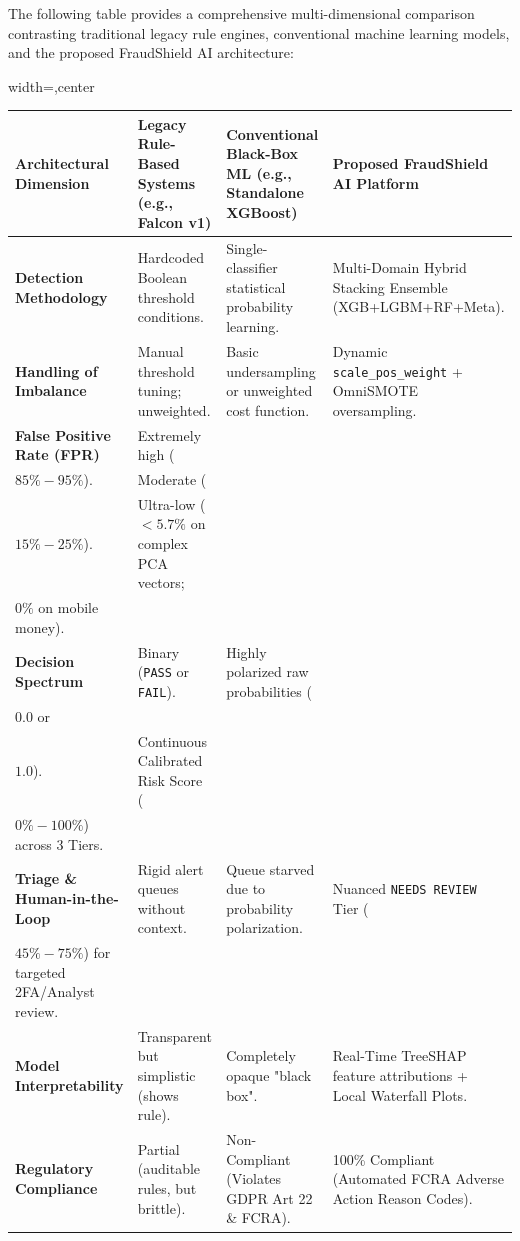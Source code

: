 \documentclass[12pt,a4paper,oneside]{report}
\begin{document}
The following table provides a comprehensive multi-dimensional comparison contrasting traditional legacy rule engines, conventional machine learning models, and the proposed FraudShield AI architecture:


\begin{table}[H]
\centering
\footnotesize
\begin{adjustbox}{width=\textwidth,center}
\begin{tabular}{| l | l | l | l |}
\hline
\rowcolor{tableheader} \textbf{Architectural Dimension} & \textbf{Legacy Rule-Based Systems (e.g., Falcon v1)} & \textbf{Conventional Black-Box ML (e.g., Standalone XGBoost)} & \textbf{Proposed FraudShield AI Platform} \\ \hline
\textbf{Detection Methodology} & Hardcoded Boolean threshold conditions. & Single-classifier statistical probability learning. & Multi-Domain Hybrid Stacking Ensemble (XGB+LGBM+RF+Meta). \\ \hline
\rowcolor{tablealt} \textbf{Handling of Imbalance} & Manual threshold tuning; unweighted. & Basic undersampling or unweighted cost function. & Dynamic \texttt{scale\_pos\_weight} + OmniSMOTE oversampling. \\ \hline
\textbf{False Positive Rate (FPR)} & Extremely high (\\$85\% - 95\%$). & Moderate (\\$15\% - 25\%$). & Ultra-low ($< 5.7\%$ on complex PCA vectors; \\$0\%$ on mobile money). \\ \hline
\rowcolor{tablealt} \textbf{Decision Spectrum} & Binary (\texttt{PASS} or \texttt{FAIL}). & Highly polarized raw probabilities (\\$0.0$ or \\$1.0$). & Continuous Calibrated Risk Score (\\$0\%-100\%$) across 3 Tiers. \\ \hline
\textbf{Triage \& Human-in-the-Loop} & Rigid alert queues without context. & Queue starved due to probability polarization. & Nuanced \texttt{NEEDS REVIEW} Tier (\\$45\%-75\%$) for targeted 2FA/Analyst review. \\ \hline
\rowcolor{tablealt} \textbf{Model Interpretability} & Transparent but simplistic (shows rule). & Completely opaque "black box". & Real-Time TreeSHAP feature attributions + Local Waterfall Plots. \\ \hline
\textbf{Regulatory Compliance} & Partial (auditable rules, but brittle). & Non-Compliant (Violates GDPR Art 22 \& FCRA). & 100\% Compliant (Automated FCRA Adverse Action Reason Codes). \\ \hline

\end{tabular}
\end{adjustbox}
\end{table}
\end{document}
